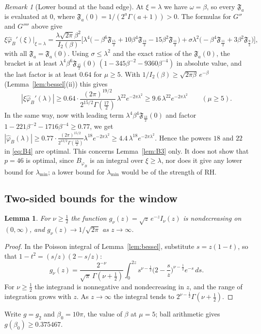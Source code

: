\documentclass[11pt]{amsart}
\newtheorem{lemma}[proposition]{Lemma}
\theoremstyle{definition}
\theoremstyle{remark}
\newtheorem{remark}[proposition]{Remark}
\numberwithin{equation}{section}
\newcommand{\F}{\mathfrak{F}}
\begin{document}
\begin{remark}[Lower bound at the band edge]\label{rem:edge}
At $\xi=\lambda$ we have $\omega=\beta$, so every $\F_a$ is evaluated at $0$, where $\F_a(0)=1/(2^a\Gamma(a+1))>0$. The formulas for $G''$ and $G''''$ above give
\[
\xi\hat\varphi_B'(\xi)\big|_{\xi=\lambda}=\frac{\lambda\sqrt{2\pi}\beta^2}{I_2(\beta)}\Big[\lambda^4\big(-\beta^6\F_{\frac{15}2}+10\beta^4\F_{\frac{13}2}-15\beta^2\F_{\frac{11}2}\big)+\sigma\lambda^2\big(-\beta^4\F_{\frac{11}2}+3\beta^2\F_{\frac92}\big)\Big],
\]
with all $\F_a=\F_a(0)$. Using $\sigma\le\lambda^2$ and the exact ratios of the $\F_a(0)$, the bracket is at least $\lambda^4\beta^6\F_{\frac{15}2}(0)\,(1-345\beta^{-2}-9360\beta^{-4})$ in absolute value, and the last factor is at least $0.64$ for $\mu\ge5$. With $1/I_2(\beta)\ge\sqrt{2\pi\beta}\,e^{-\beta}$ (Lemma~\ref{lem:bessel}(ii)) this gives
\[
|\xi\hat\varphi_B'(\lambda)|\ge0.64\cdot\frac{(2\pi)^{19/2}}{2^{15/2}\Gamma(\frac{17}2)}\,\lambda^{22}e^{-2\pi\lambda^2}\ge9.6\,\lambda^{22}e^{-2\pi\lambda^2}\qquad(\mu\ge5).
\]
In the same way, now with leading term $\lambda^4\beta^4\F_{\frac{13}2}(0)$ and factor $1-221\beta^{-2}-1716\beta^{-4}\ge0.77$, we get $|\hat\varphi_B(\lambda)|\ge0.77\cdot\frac{(2\pi)^{15/2}}{2^{13/2}\Gamma(\frac{15}2)}\lambda^{18}e^{-2\pi\lambda^2}\ge4.4\,\lambda^{18}e^{-2\pi\lambda^2}$. Hence the powers $18$ and $22$ in \eqref{eq:B4} are optimal. This concerns Lemma~\ref{lem:B3} only. It does not show that $p=46$ is optimal, since $B_{\varphi_B}$ is an integral over $\xi\ge\lambda$, nor does it give any lower bound for $\lambda_{\min}$; a lower bound for $\lambda_{\min}$ would be of the strength of RH.
\end{remark}

\subsection{Two-sided bounds for the window}
\begin{lemma}\label{lem:gmono}
For $\nu\ge\frac12$ the function $g_\nu(z)=\sqrt z\,e^{-z}I_\nu(z)$ is nondecreasing on $(0,\infty)$, and $g_\nu(z)\to1/\sqrt{2\pi}$ as $z\to\infty$.
\end{lemma}
\begin{proof}
In the Poisson integral of Lemma~\ref{lem:bessel}, substitute $s=z(1-t)$, so that $1-t^2=(s/z)(2-s/z)$:
\[
g_\nu(z)=\frac{2^{-\nu}}{\sqrt\pi\,\Gamma(\nu+\frac12)}\int_0^{2z}s^{\nu-\frac12}\Big(2-\frac sz\Big)^{\nu-\frac12}e^{-s}\,ds .
\]
For $\nu\ge\frac12$ the integrand is nonnegative and nondecreasing in $z$, and the range of integration grows with $z$. As $z\to\infty$ the integral tends to $2^{\nu-\frac12}\Gamma(\nu+\frac12)$.
\end{proof}
Write $g=g_2$ and $\beta_0=10\pi$, the value of $\beta$ at $\mu=5$; ball arithmetic gives $g(\beta_0)\ge0.375467$.
\end{document}
